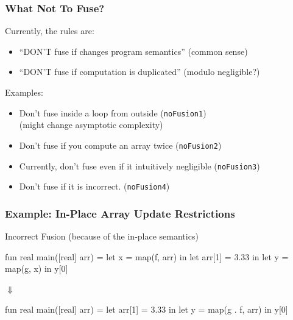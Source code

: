 \documentclass{beamer}
\begin{document}
\begin{frame}[fragile,t]
  \frametitle{What Not To Fuse?}

  Currently, the rules are:

  \begin{itemize}
  \item ``DON'T fuse if changes program semantics'' (common sense)
  \item ``DON'T fuse if computation is duplicated'' (modulo negligible?)
  \end{itemize}

  \bigskip

  Examples:
  \begin{itemize}
  \item Don't fuse inside a loop from outside (\texttt{noFusion1})\\
    (might change asymptotic complexity) \smallskip

  \item Don't fuse if you compute an array twice (\texttt{noFusion2})\smallskip

  \item Currently, don't fuse even if it intuitively negligible (\texttt{noFusion3})\smallskip

  \item Don't fuse if it is incorrect. (\texttt{noFusion4})
  \end{itemize}

\end{frame}

\begin{frame}[fragile,t]
  \frametitle{Example: In-Place Array Update Restrictions}

  \begin{block}{Incorrect Fusion (because of the in-place semantics)}
    \begin{center}
      \begin{colorcode}[fontsize=\scriptsize]
fun real main([real] arr) =
let x      = map(f, arr)  in
let arr[1] = 3.33         in
let y      = map(g, x)    in
y[0]
      \end{colorcode}
      $\Downarrow$
      \begin{colorcode}[fontsize=\scriptsize]
fun real main([real] arr) =
let arr[1] = 3.33            in
let y      = map(g . f, arr) in
y[0]
      \end{colorcode}
    \end{center}
  \end{block}
\end{frame}
\end{document}
